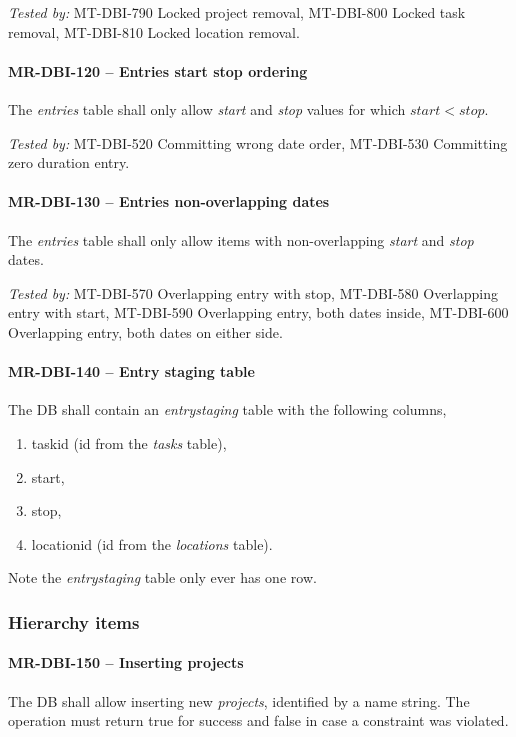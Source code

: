 \textit{Tested by: } MT-DBI-790 Locked project removal,
MT-DBI-800 Locked task removal,
MT-DBI-810 Locked location removal.

\paragraph{MR-DBI-120 -- Entries start stop ordering}
The \emph{entries} table shall only allow \emph{start} and \emph{stop}
values for which $start < stop$.

\textit{Tested by: } MT-DBI-520 Committing wrong date order,
MT-DBI-530 Committing zero duration entry.

\paragraph{MR-DBI-130 -- Entries non-overlapping dates}
The \emph{entries} table shall only allow items with non-overlapping
\emph{start} and \emph{stop} dates.

\textit{Tested by: } MT-DBI-570 Overlapping entry with stop,
MT-DBI-580 Overlapping entry with start,
MT-DBI-590 Overlapping entry, both dates inside,
MT-DBI-600 Overlapping entry, both dates on either side.

\paragraph{MR-DBI-140 -- Entry staging table}
The \gls{DB} shall contain an \emph{entrystaging} table with the following
columns,
\begin{enumerate}
\item task\textunderscore id (id from the \emph{tasks} table),
\item start,
\item stop,
\item location\textunderscore id (id from the \emph{locations} table).
\end{enumerate}

Note the \emph{entrystaging} table only ever has one row.

\subsubsection{Hierarchy items}
\paragraph{MR-DBI-150 -- Inserting projects}
The \gls{DB} shall allow inserting new \emph{projects}, identified by a name
string. The operation must return true for success and false in case
a constraint was violated.

